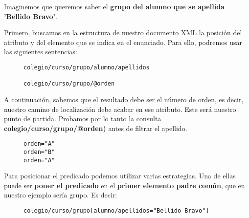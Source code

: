      Imaginemos que queremos saber el \textbf{grupo del alumno que se apellida 'Bellido Bravo'}.


     Primero, buscamos en la estructura de nuestro documento XML la posición del atributo y del elemento que se indica en el enunciado. Para ello, podremos usar las siguientes sentencias:

         \begin{figure}[h]
             \begin{tcolorbox}[sharp corners, colback=yellow!30, colframe=white!20]
                 \scriptsize
                 \begin{verbatim}
colegio/curso/grupo/alumno/apellidos

colegio/curso/grupo/@orden
\end{verbatim}
             \end{tcolorbox}
         \end{figure}

        A continuación, sabemos que el resultado debe ser el número de orden, es decir, nuestro camino de localización debe acabar en ese atributo. Este será nuestro punto de partida. Probamos por lo tanto la consulta \textbf{colegio/curso/grupo/@orden)} antes de filtrar el apellido.
        \begin{figure}[H]
            \begin{tcolorbox}[sharp corners, colback=yellow!30, colframe=white!20]
                \scriptsize
                \begin{verbatim}
orden="A"
orden="B"
orden="A"
\end{verbatim}
            \end{tcolorbox}
        \end{figure}

        Para posicionar el predicado podemos utilizar varias estrategias. Una de ellas puede ser \textbf{poner el predicado} en el \textbf{primer elemento padre común}, que en nuestro ejemplo sería grupo. Es decir:
         \begin{figure}[H]
            \begin{tcolorbox}[sharp corners, colback=yellow!30, colframe=white!20]
                \scriptsize

\begin{verbatim}
colegio/curso/grupo[alumno/apellidos="Bellido Bravo"]
\end{verbatim}
            \end{tcolorbox}
        \end{figure}

